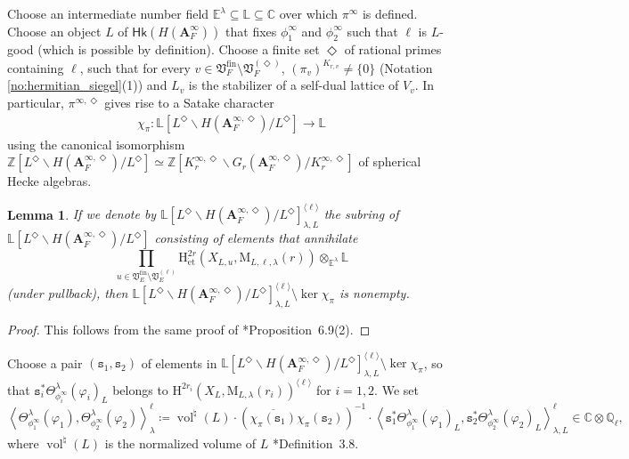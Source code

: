 \documentclass[12pt]{amsart}
\numberwithin{equation}{section}
\theoremstyle{plain}
\newtheorem{lem}[proposition]{Lemma}
\theoremstyle{definition}
\theoremstyle{remark}
\renewcommand{\b}[1]{\mathbf{#1}}
\renewcommand{\d}[1]{\mathbb{#1}}
\newcommand{\f}[1]{\mathfrak{#1}}
\renewcommand{\r}[1]{\mathrm{#1}}
\renewcommand{\sf}[1]{\mathsf{#1}}
\renewcommand{\(}{\left(}
\renewcommand{\)}{\right)}
\newcommand{\ang}[1]{\langle{#1}\rangle}
\newcommand{\ol}[1]{\overline{#1}{}}
\newcommand{\bA}{\b A}
\newcommand{\dC}{\d C}
\newcommand{\dE}{\d E}
\newcommand{\dL}{\d L}
\newcommand{\dQ}{\d Q}
\newcommand{\dZ}{\d Z}
\newcommand{\fV}{\f V}
\newcommand{\rH}{\r H}
\newcommand{\rM}{\r M}
\newcommand{\ts}{\mathtt{s}}
\newcommand{\llangle}{\left\langle}
\newcommand{\rrangle}{\right\rangle}
\newcommand{\et}{{\acute{\r{e}}\r{t}}}
\newcommand{\fin}{\r{fin}}
\newcommand{\Hk}{\sf{Hk}}
\DeclareMathOperator{\Ker}{ker}
\DeclareMathOperator{\vol}{vol}
\begin{document}
Choose an intermediate number field $\dE^\lambda\subseteq\dL\subseteq\dC$ over which $\pi^\infty$ is defined. Choose an object $L$ of $\Hk(H(\bA_F^\infty))$ that fixes $\phi^\infty_1$ and $\phi^\infty_2$ such that $\ell$ is $L$-good (which is possible by definition). Choose a finite set $\Diamond$ of rational primes containing $\ell$, such that for every $v\in\fV_F^\fin\setminus\fV_F^{(\Diamond)}$, $(\pi_v)^{K_{r,v}}\neq\{0\}$ (Notation \ref{no:hermitian_siegel}(1)) and $L_v$ is the stabilizer of a self-dual lattice of $V_v$. In particular, $\pi^{\infty,\Diamond}$ gives rise to a Satake character
\begin{align}\label{eq:sakata_character}
\chi_\pi\colon\dL[L^\Diamond\backslash H(\bA_F^{\infty,\Diamond})/L^\Diamond]\to\dL
\end{align}
using the canonical isomorphism $\dZ[L^\Diamond\backslash H(\bA_F^{\infty,\Diamond})/L^\Diamond]\simeq
\dZ[K_r^{\infty,\Diamond}\backslash G_r(\bA_F^{\infty,\Diamond})/K_r^{\infty,\Diamond}]$ of spherical Hecke algebras.

\begin{lem}\label{le:cohomological_annihilation}
If we denote by $\dL[L^\Diamond\backslash H(\bA_F^{\infty,\Diamond})/L^\Diamond]^{\ang\ell}_{\lambda,L}$ the subring of $\dL[L^\Diamond\backslash H(\bA_F^{\infty,\Diamond})/L^\Diamond]$ consisting of elements that annihilate
\[
\prod_{u\in\fV_E^\fin\setminus\fV_E^{(\ell)}}
\rH^{2r}_{\et}(X_{L,u},\rM_{L,\ell,\lambda}(r))\otimes_{\dE^\lambda}\dL
\]
(under pullback), then $\dL[L^\Diamond\backslash H(\bA_F^{\infty,\Diamond})/L^\Diamond]^{\ang\ell}_{\lambda,L}\setminus\Ker\chi_\pi$ is nonempty.
\end{lem}

\begin{proof}
This follows from the same proof of \cite{LL21}*{Proposition~6.9(2)}.
\end{proof}

Choose a pair $(\ts_1,\ts_2)$ of elements in $\dL[L^\Diamond\backslash H(\bA_F^{\infty,\Diamond})/L^\Diamond]^{\ang\ell}_{\lambda,L}\setminus\Ker\chi_\pi$, so that $\ts_i^*\Theta_{\phi^\infty_i}^\lambda(\varphi_i)_L$ belongs to $\rH^{2r_i}(X_L,\rM_{L,\lambda}(r_i))^{\ang\ell}$ for $i=1,2$. We set
\[
\llangle\Theta_{\phi^\infty_1}^\lambda(\varphi_1),\Theta_{\phi^\infty_2}^\lambda(\varphi_2)\rrangle_\lambda^\ell\coloneqq
\vol^\natural(L)\cdot\(\ol{\chi_\pi(\ts_1)}\chi_\pi(\ts_2)\)^{-1}\cdot
\llangle\ts_1^*\Theta_{\phi^\infty_1}^\lambda(\varphi_1)_L,
\ts_2^*\Theta_{\phi^\infty_2}^\lambda(\varphi_2)_L\rrangle_{\lambda,L}^{\ell}
\in\dC\otimes\dQ_\ell,
\]
where $\vol^\natural(L)$ is the normalized volume of $L$ \cite{LL21}*{Definition~3.8}.
\end{document}
